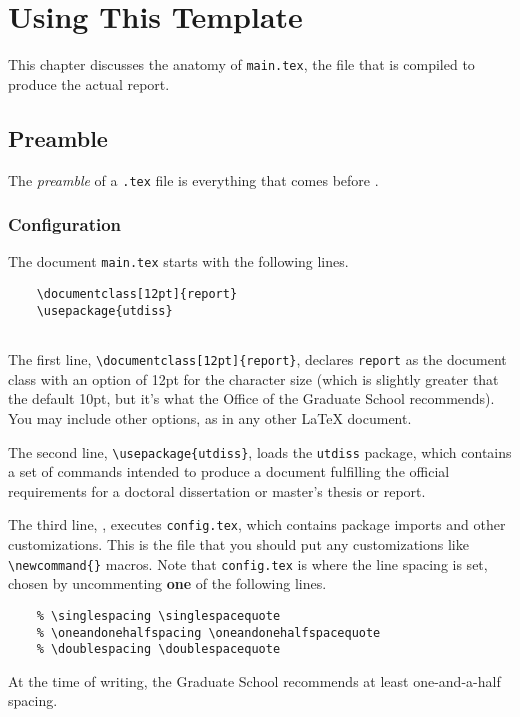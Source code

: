 \chapter{Using This Template}

This chapter discusses the anatomy of \texttt{main.tex}, the file that is compiled to produce the actual report.

\section{Preamble} %

The \emph{preamble} of a \texttt{.tex} file is everything that comes before \verb++.

\subsection{Configuration} %

The document \texttt{main.tex} starts with the following lines.
\begin{verbatim}
    \documentclass[12pt]{report}
    \usepackage{utdiss}
    
\end{verbatim}

The first line, \verb+\documentclass[12pt]{report}+, declares \texttt{report} as the document class with an option of 12pt for the character size (which is slightly greater that the default 10pt, but it's what the Office of the Graduate School recommends).
You may include other options, as in any other \LaTeX{} document.

The second line, \verb+\usepackage{utdiss}+, loads the \texttt{utdiss} package, which contains a set of commands intended to produce a document fulfilling the official requirements for a doctoral dissertation or master's thesis or report.

The third line, \verb++, executes \texttt{config.tex}, which contains package imports and other customizations.
This is the file that you should put any customizations like \verb+\newcommand{}+ macros.
Note that \texttt{config.tex} is where the line spacing is set, chosen by uncommenting \textbf{one} of the following lines.
\begin{verbatim}
    % \singlespacing \singlespacequote
    % \oneandonehalfspacing \oneandonehalfspacequote
    % \doublespacing \doublespacequote
\end{verbatim}
%
%
%
%
%
%
At the time of writing, the Graduate School recommends at least one-and-a-half spacing.

